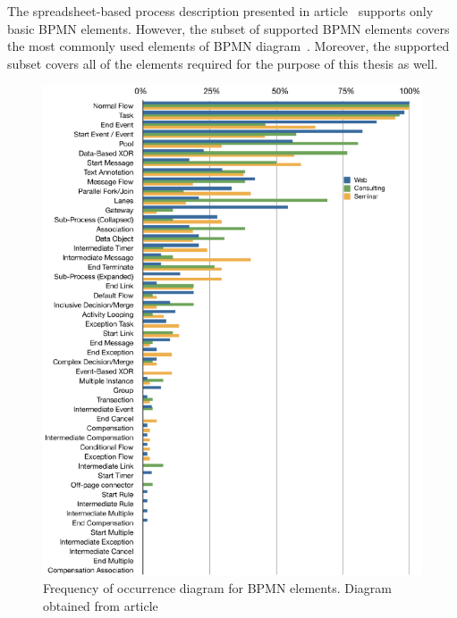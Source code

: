 The spreadsheet-based process description presented in article~\cite{kluza-spreadsheet} supports only basic BPMN elements. However, the subset of supported BPMN elements covers the most commonly used elements of BPMN diagram~\cite{bpmn-stats}. Moreover, the supported subset covers all of the elements required for the purpose of this thesis as well.
\begin{figure}
	\centering
	\includegraphics[width=\textwidth]{./images/bpmn_usage_stats.pdf}
	\caption{Frequency of occurrence diagram for BPMN elements. Diagram obtained from article~\cite{bpmn-stats}}
	\label{fig:bpmn_usage_stats}
\end{figure}


